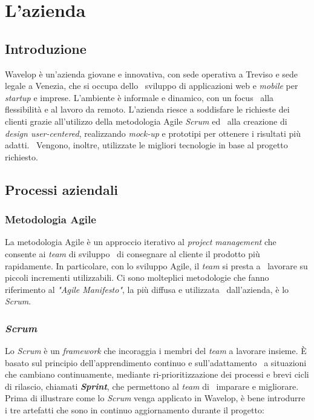 
\chapter{L'azienda}
\label{cap:azienda}
\section{Introduzione}
Wavelop è un’azienda giovane e innovativa, con sede operativa a Treviso e sede legale a Venezia, che si occupa dello \
sviluppo di applicazioni web e \emph{mobile} per \emph{startup} e imprese. L’ambiente è informale e dinamico, con un focus \
alla flessibilità e al lavoro da remoto. L’azienda riesce a soddisfare le richieste dei clienti grazie all’utilizzo della metodologia Agile \emph{Scrum} ed \
alla creazione di \emph{design user-centered}, realizzando \emph{\gls{mock-up}} e prototipi per ottenere i risultati più adatti. \
Vengono, inoltre, utilizzate le migliori tecnologie in base al progetto richiesto.

\section{Processi aziendali}

\subsection{Metodologia Agile}
La metodologia Agile è un approccio iterativo al \emph{project management} che consente ai \emph{team} di sviluppo \
di consegnare al cliente il prodotto più rapidamente. In particolare, con lo sviluppo Agile, il \emph{team} si presta a \
lavorare su piccoli incrementi utilizzabili. Ci sono molteplici metodologie che fanno riferimento al \emph{"Agile Manifesto"}, la più diffusa e utilizzata \
dall'azienda, è lo \emph{Scrum}.

\subsection{\emph{Scrum}}
Lo \emph{Scrum} è un \emph{framework} che incoraggia i membri del \emph{team} a lavorare insieme. È basato sul principio dell'apprendimento continuo e sull'adattamento \
a situazioni che cambiano continuamente, mediante ri-prioritizzazione dei processi e brevi cicli di rilascio, chiamati \textbf{\emph{Sprint}}, che permettono al \emph{team} di \
imparare e migliorare. Prima di illustrare come lo \emph{Scrum} venga applicato in Wavelop, è bene introdurre i tre artefatti che sono in continuo aggiornamento durante il progetto:

